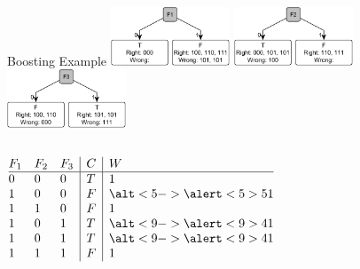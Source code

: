 \documentclass[14pt]{beamer}
\begin{document}
\begin{frame}{Boosting Example}
\includegraphics[width=1.4in]{boosting_f1}
\includegraphics[width=1.4in]{boosting_f2}
\includegraphics[width=1.4in]{boosting_f3}
\medskip
\small
\begin{columns}
\begin{column}{1.5in}
$
\begin{array}{@{}lll|l|l@{}}
F_1 & F_2 & F_3 & C & W \\
\hline
0 & 0 & 0 & T & 1 \\
1 & 0 & 0 & F & \alt<5->{\alert<5>{5}}{1} \\
1 & 1 & 0 & F & 1 \\
1 & 0 & 1 & T & \alt<9->{\alert<9>{4}}{1} \\
1 & 0 & 1 & T & \alt<9->{\alert<9>{4}}{1} \\
1 & 1 & 1 & F & 1 \\
\end{array}
$
\end{column}
\begin{column}{2.3in}
 \\
 \\
\medskip
{} \\
 \\
\medskip
{}
\end{column}
\end{columns}
\end{frame}
\end{document}
